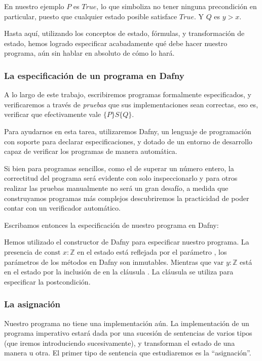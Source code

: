 \documentclass[12pt, a4paper, openany, fleqn]{book}
\newcommand{\declConst}[2]{\text{const } #1 : #2}
\newcommand{\declVar}[2]{\text{var } #1 : #2}
\begin{document}
    En nuestro ejemplo $P$ es $True$, lo que simboliza no tener ninguna precondición en particular, puesto que cualquier estado posible satisface $True$. Y $Q$ es $y > x$.

    Hasta aquí, utilizando los conceptos de estado, fórmulas, y transformación de estado, hemos logrado especificar acabadamente qué debe hacer nuestro programa, aún sin hablar en absoluto de cómo lo hará.

    \subsubsection*{La especificación de un programa en Dafny}

    A lo largo de este trabajo, escribiremos programas formalmente especificados, y verificaremos a través de \textit{pruebas} que sus implementaciones sean correctas, eso es, verificar que efectivamente vale $\{P\}S\{Q\}$.

    Para ayudarnos en esta tarea, utilizaremos Dafny, un lenguaje de programación con soporte para declarar especificaciones, y dotado de un entorno de desarrollo capaz de verificar los programas de manera automática.

    Si bien para programas sencillos, como el de superar un número entero, la correctitud del programa será evidente con solo inspeccionarlo y para otros realizar las pruebas manualmente no será un gran desafío, a medida que construyamos programas más complejos descubriremos la practicidad de poder contar con un verificador automático.

    Escribamos entonces la especificación de nuestro programa en Dafny:


    Hemos utilizado el constructor  de Dafny para especificar nuestro programa. La presencia de $\declConst{x}{\mathbb{Z}}$ en el estado está reflejada por el parámetro , los parámetros de los métodos en Dafny son inmutables. Mientras que $\declVar{y}{\mathbb{Z}}$ está en el estado por la inclusión de  en la cláusula .
    La cláusula  se utiliza para especificar la postcondición.

    \subsubsection*{La asignación}
    Nuestro programa no tiene una implementación aún. La implementación de un programa imperativo estará dada por una sucesión de sentencias de varios tipos (que iremos introduciendo sucesivamente), y transforman el estado de una manera u otra. El primer tipo de sentencia que estudiaremos es la ``asignación''.
\end{document}
